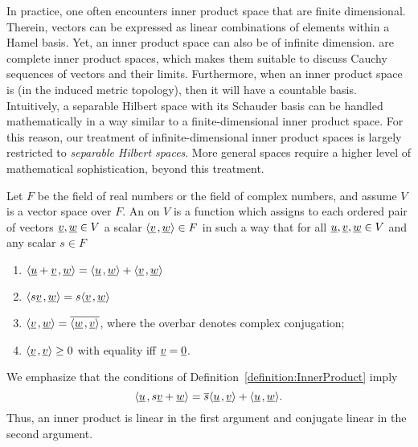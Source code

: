 In practice, one often encounters inner product space that are finite dimensional.
Therein, vectors can be expressed as linear combinations of elements within a Hamel basis. 
Yet, an inner product space can also be of infinite dimension.
 are complete inner product spaces, which makes them suitable to discuss Cauchy sequences of vectors and their limits.
Furthermore, when an inner product space is  (in the induced metric topology), then it will have a countable  basis.
Intuitively, a separable Hilbert space with its Schauder basis can be handled mathematically in a way similar to a finite-dimensional inner product space.
For this reason, our treatment of infinite-dimensional inner product spaces is largely restricted to \emph{separable Hilbert spaces}.
More general spaces require a higher level of mathematical sophistication, beyond this treatment.

\begin{definition} \label{definition:InnerProduct}
Let $F$ be the field of real numbers or the field of complex numbers, and assume $V$ is a vector space over $F$.
An  on $V$ is a function which assigns to each ordered pair of vectors $\underline{v}, \underline{w} \in V$ a scalar ${\left\langle  \underline{v}  \mskip2mu ,  \underline{w}  \right\rangle} \in F$ in such a way that for all $\underline{u}, \underline{v}, \underline{w} \in V$ and any scalar $s \in F$
\begin{enumerate}
\item ${\left\langle  \underline{u} + \underline{v}  \mskip2mu ,  \underline{w}  \right\rangle}
= {\left\langle  \underline{u}  \mskip2mu ,  \underline{w}  \right\rangle}
+ {\left\langle  \underline{v}  \mskip2mu ,  \underline{w}  \right\rangle}$
\item ${\left\langle  s \underline{v}  \mskip2mu ,  \underline{w}  \right\rangle}
= s {\left\langle  \underline{v}  \mskip2mu ,  \underline{w}  \right\rangle}$
\item ${\left\langle  \underline{v}  \mskip2mu ,  \underline{w}  \right\rangle}
= \overline{ {\left\langle  \underline{w}  \mskip2mu ,  \underline{v}  \right\rangle} }$, where the overbar denotes complex conjugation;
\item ${\left\langle  \underline{v}  \mskip2mu ,  \underline{v}  \right\rangle} \geq 0$ with equality iff $\underline{v} = \underline{0}$.
\end{enumerate}
\end{definition}

We emphasize that the conditions of Definition~\ref{definition:InnerProduct} imply
\begin{equation*}
{\left\langle  \underline{u}  \mskip2mu ,  s \underline{v} + \underline{w}  \right\rangle}
= \overline{s} {\left\langle  \underline{u}  \mskip2mu ,  \underline{v}  \right\rangle}
+ {\left\langle  \underline{u}  \mskip2mu ,  \underline{w}  \right\rangle} .
\end{equation*}
Thus, an inner product is linear in the first argument and conjugate linear in the second argument.

